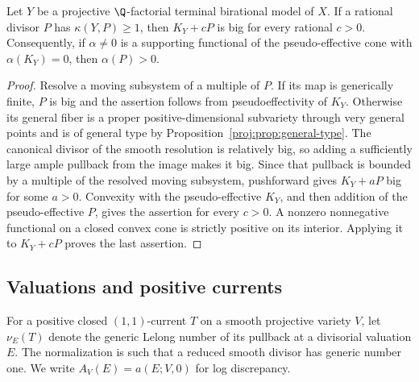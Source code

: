 \begin{corollary}\label{proj:ex:supporting}
Let \(Y\) be a projective \(\Q\)-factorial terminal birational model
of \(X\). If a rational divisor \(P\) has \(\kappa(Y,P)\geq1\),
then \(K_Y+cP\) is big for every rational \(c>0\).
Consequently, if \(\alpha\neq0\) is a supporting functional of the
pseudo-effective cone with \(\alpha(K_Y)=0\), then
\(\alpha(P)>0\).
\end{corollary}
\begin{proof}
Resolve a moving subsystem of a multiple of \(P\). If its map is
generically finite, \(P\) is big and the assertion follows from
pseudoeffectivity of \(K_Y\). Otherwise its general fiber is a
proper positive-dimensional subvariety through very general
points and is of general type by Proposition~\ref{proj:prop:general-type}.
The canonical divisor of the smooth resolution is relatively big,
so adding a sufficiently large ample pullback from the image makes
it big. Since that pullback is bounded by a multiple of the
resolved moving subsystem, pushforward gives \(K_Y+aP\) big for
some \(a>0\). Convexity with the pseudo-effective \(K_Y\), and then
addition of the pseudo-effective \(P\), gives the assertion for
every \(c>0\). A nonzero nonnegative functional on a closed convex
cone is strictly positive on its interior. Applying it to
\(K_Y+cP\) proves the last assertion.
\end{proof}

\subsection{Valuations and positive currents}

For a positive closed \((1,1)\)-current \(T\) on a smooth projective
variety \(V\), let \(\nu_E(T)\) denote the generic Lelong number of
its pullback at a divisorial valuation \(E\). The normalization is
such that a reduced smooth divisor has generic number one. We
write \(A_V(E)=a(E;V,0)\) for log discrepancy.

